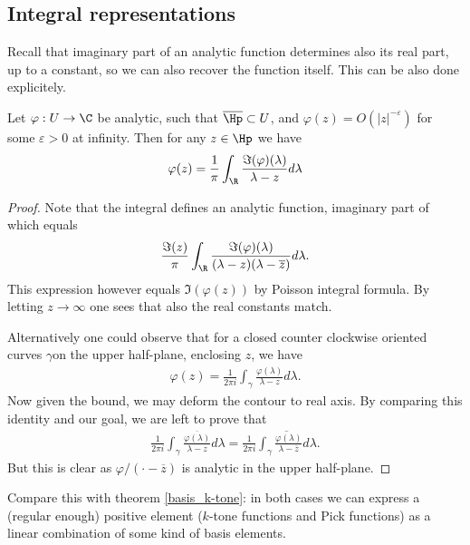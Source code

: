 \subsection{Integral representations}

Recall that imaginary part of an analytic function determines also its real part, up to a constant, so we can also recover the function itself. This can be also done explicitely.

\begin{lause}
	Let $\varphi : U \to \C$ be analytic, such that $\overline{\Hp} \subset U$, and $\varphi(z) = O(|z|^{-\varepsilon})$ for some $\varepsilon > 0$ at infinity. Then for any $z \in \Hp$ we have
	\begin{align*}
		\varphi(z) = \frac{1}{\pi}\int_{\R} \frac{\Im(\varphi)(\lambda)}{\lambda - z} d \lambda
	\end{align*}
\end{lause}
\begin{proof}
	Note that the integral defines an analytic function, imaginary part of which equals
	\begin{align*}
		\frac{\Im(z)}{\pi}\int_{\R} \frac{\Im(\varphi)(\lambda)}{(\lambda - z)(\lambda - \overline{z})} d \lambda.
	\end{align*}
	This expression however equals $\Im(\varphi(z))$ by Poisson integral formula. By letting $z \to \infty$ one sees that also the real constants match.

	Alternatively one could observe that for a closed counter clockwise oriented curves $\gamma $on the upper half-plane, enclosing $z$, we have
	\begin{align*}
		\varphi(z) = \frac{1}{2\pi i}\int_{\gamma} \frac{\varphi(\lambda)}{\lambda - z} d \lambda.
	\end{align*}
	Now given the bound, we may deform the contour to real axis. By comparing this identity and our goal, we are left to prove that
	\begin{align*}
		\frac{1}{2\pi i}\int_{\gamma} \frac{\overline{\varphi(\lambda)}}{\lambda - z} d \lambda = \frac{1}{2\pi i} \overline{\int_{\gamma} \frac{\varphi(\lambda)}{\lambda - \overline{z}} d \lambda}.
	\end{align*}
	But this is clear as $\varphi/(\cdot - \overline{z})$ is analytic in the upper half-plane.
\end{proof}

Compare this with theorem \ref{basis_k-tone}: in both cases we can express a (regular enough) positive element ($k$-tone functions and Pick functions) as a linear combination of some kind of basis elements.


